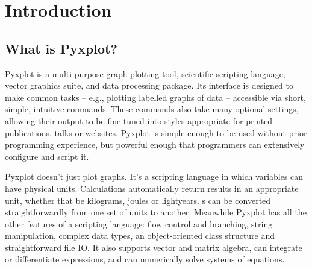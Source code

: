 %
%
%
%
%



\chapter{Introduction}

\label{ch:introduction}

\section{What is Pyxplot?}

Pyxplot is a multi-purpose graph plotting tool, scientific scripting language,
vector graphics suite, and data processing package.  Its interface is designed
to make common tasks -- e.g., plotting labelled graphs of data -- accessible
via short, simple, intuitive commands. These commands also take many optional
settings, allowing their output to be fine-tuned into styles appropriate for
printed publications, talks or websites.  Pyxplot is simple enough to be used
without prior programming experience, but powerful enough that programmers can
extensively configure and script it.


Pyxplot doesn't just plot graphs. It's a scripting language in which variables
can have physical units. Calculations automatically return results in an
appropriate unit, whether that be kilograms, joules or lightyears.  \Datafile s
can be converted straightforwardly from one set of units to another. Meanwhile
Pyxplot has all the other features of a scripting language: flow control and
branching, string manipulation, complex data types, an object-oriented class
structure and straightforward file IO.  It also supports vector and matrix
algebra, can integrate or differentiate expressions, and can numerically solve
systems of equations.

